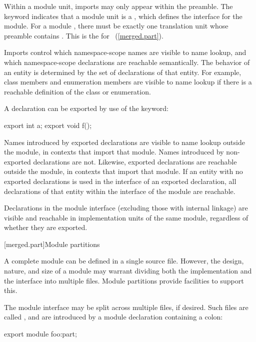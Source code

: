 Within a module unit, imports may only appear within the preamble.
The  keyword indicates that a module unit is a
, which defines the interface for the module.
For a module , there must be exactly one
translation unit whose preamble contains .
This is the 
for ~(\ref{merged.part}).

\pnum
Imports control which namespace-scope names are visible to name lookup,
and which namespace-scope declarations are reachable semantically.
The behavior of an entity is determined by
the set of declarations of that entity.
For example, class members and enumeration members are visible to name lookup
if there is a reachable definition of the class or enumeration.
 
\pnum
A declaration can be exported by use of the  keyword:
\begin{codeblock}
export int a;
export {
void f();
}
\end{codeblock}
Names introduced by exported declarations
are visible to name lookup outside the module,
in contexts that import that module.
Names introduced by non-exported declarations are not.
Likewise, exported declarations are reachable outside the module,
in contexts that import that module.
If an entity with no exported declarations
is used in the interface of an exported declaration, 
all declarations of that entity
within the interface of the module
are reachable.

\pnum
Declarations in the module interface (excluding those with internal linkage)
are visible and reachable in implementation units of the same module,
regardless of whether they are exported.

[merged.part]{Module partitions}

\pnum
A complete module can be defined in a single source file.
However, the design, nature, and size of a module may warrant
dividing both the implementation and the interface
into multiple files.
Module partitions provide facilities to support this.

\pnum
The module interface may be split across multiple files,
if desired.
Such files are called , and are
introduced by a module declaration containing a colon:

\begin{codeblock}
export module foo:part;
\end{codeblock}

